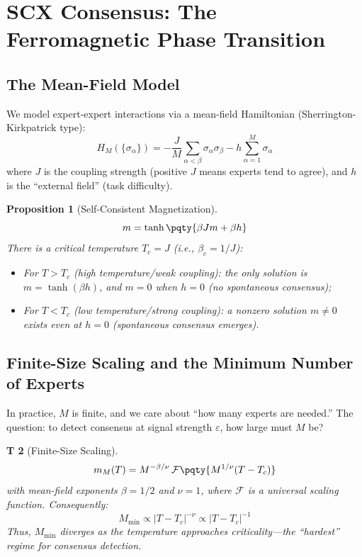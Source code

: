 \documentclass[12pt,a4paper]{article}
\newtheorem{theorem}Theorem[section]
\newtheorem{proposition}[theorem]{Proposition}
\begin{document}
\section{SCX Consensus: The Ferromagnetic Phase Transition}
\subsection{The Mean-Field Model}
We model expert-expert interactions via a mean-field Hamiltonian (Sherrington-Kirkpatrick type):
\begin{equation}\label{eq:sk_analog}
H_M(\{\sigma_\alpha\}) = -\frac{J}{M} \sum_{\alpha < \beta} \sigma_\alpha \sigma_\beta - h \sum_{\alpha=1}^{M} \sigma_\alpha
\end{equation}
where \(J\) is the coupling strength (positive \(J\) means experts tend to agree), and \(h\) is the ``external field'' (task difficulty).

\begin{proposition}[Self-Consistent Magnetization]\label{prop:phase_trans}
\begin{equation}\label{eq:self_consistent}
m = \tanh\pqty{\beta J m + \beta h}
\end{equation}
There is a critical temperature \(T_c = J\) (i.e., \(\beta_c = 1/J\)):
\begin{itemize}
    \item For \(T > T_c\) (high temperature/weak coupling): the only solution is \(m = \tanh(\beta h)\), and \(m=0\) when \(h=0\) (no spontaneous consensus);
    \item For \(T < T_c\) (low temperature/strong coupling): a nonzero solution \(m \neq 0\) exists even at \(h=0\) (spontaneous consensus emerges).
\end{itemize}
\end{proposition}

\subsection{Finite-Size Scaling and the Minimum Number of Experts}
In practice, \(M\) is finite, and we care about ``how many experts are needed.'' The question: to detect consensus at signal strength \(\varepsilon\), how large must \(M\) be?

\begin{theorem}[Finite-Size Scaling]\label{thm:finite_M}
\begin{equation}\label{eq:fss}
m_M(T) = M^{-\beta/\nu} \, \mathcal{F}\pqty{M^{1/\nu}(T - T_c)}
\end{equation}
with mean-field exponents \(\beta = 1/2\) and \(\nu = 1\), where \(\mathcal{F}\) is a universal scaling function. Consequently:
\begin{equation}\label{eq:M_min_scaling}
M_{\min} \propto |T - T_c|^{-\nu} \propto |T - T_c|^{-1}
\end{equation}
Thus, \(M_{\min}\) diverges as the temperature approaches criticality---the ``hardest'' regime for consensus detection.
\end{theorem}
\end{document}
